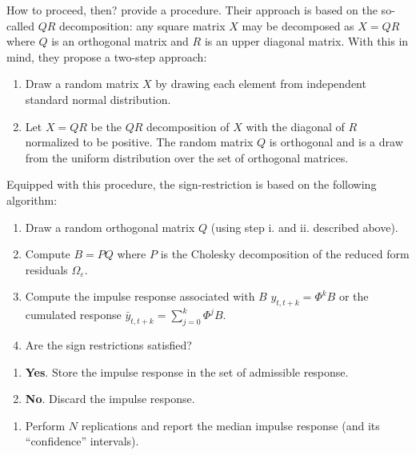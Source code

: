 \documentclass[
  11pt,
]{book}
\providecommand{\tightlist}{%
  \setlength{\itemsep}{0pt}\setlength{\parskip}{0pt}}
\theoremstyle{definition}
\theoremstyle{definition}
\theoremstyle{definition}
\theoremstyle{definition}
\theoremstyle{remark}
\begin{document}
How to proceed, then? \citet{Arias_et_al_2018} provide a procedure. Their approach is based on the so-called \(QR\) decomposition: any square matrix \(X\) may be decomposed as \(X=QR\) where \(Q\) is an orthogonal matrix and \(R\) is an upper diagonal matrix. With this in mind, they propose a two-step approach:

\begin{enumerate}
\def\labelenumi{\roman{enumi}.}
\tightlist
\item
  Draw a random matrix \(X\) by drawing each element from independent standard normal distribution.
\item
  Let \(X = QR\) be the \(QR\) decomposition of \(X\) with the diagonal of \(R\) normalized to be
  positive. The random matrix \(Q\) is orthogonal and is a draw from the uniform distribution over the set of orthogonal matrices.
\end{enumerate}

Equipped with this procedure, the sign-restriction is based on the following algorithm:

\begin{enumerate}
\def\labelenumi{\arabic{enumi}.}
\tightlist
\item
  Draw a random orthogonal matrix \(Q\) (using step i. and ii. described above).
\item
  Compute \(B = PQ\) where \(P\) is the Cholesky decomposition of the reduced form residuals \(\Omega_{\varepsilon}\).
\item
  Compute the impulse response associated with \(B\) \(y_{t,t+k}=\Phi^kB\) or the cumulated response \(\bar y_{t,t+k}=\sum_{j=0}^{k}\Phi^jB\).
\item
  Are the sign restrictions satisfied?
\end{enumerate}

\begin{enumerate}
\def\labelenumi{\alph{enumi}.}
\tightlist
\item
  \textbf{Yes}. Store the impulse response in the set of admissible response.
\item
  \textbf{No}. Discard the impulse response.
\end{enumerate}

\begin{enumerate}
\def\labelenumi{\arabic{enumi}.}
\setcounter{enumi}{4}
\tightlist
\item
  Perform \(N\) replications and report the median impulse response (and its ``confidence'' intervals).
\end{enumerate}
\end{document}
